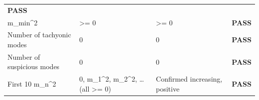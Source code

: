 \documentclass[
  11pt,
]{article}
\begin{document}
\begin{longtable}[]{@{}llll@{}}
\begin{minipage}[t]{0.22\columnwidth}
\textbf{PASS}\strut
\end{minipage}\tabularnewline
\begin{minipage}[t]{0.22\columnwidth}\raggedright
m\_min\^{}2\strut
\end{minipage} & \begin{minipage}[t]{0.22\columnwidth}\raggedright
\textgreater= 0\strut
\end{minipage} & \begin{minipage}[t]{0.22\columnwidth}\raggedright
\textgreater= 0\strut
\end{minipage} & \begin{minipage}[t]{0.22\columnwidth}\raggedright
\textbf{PASS}\strut
\end{minipage}\tabularnewline
\begin{minipage}[t]{0.22\columnwidth}\raggedright
Number of tachyonic modes\strut
\end{minipage} & \begin{minipage}[t]{0.22\columnwidth}\raggedright
0\strut
\end{minipage} & \begin{minipage}[t]{0.22\columnwidth}\raggedright
0\strut
\end{minipage} & \begin{minipage}[t]{0.22\columnwidth}\raggedright
\textbf{PASS}\strut
\end{minipage}\tabularnewline
\begin{minipage}[t]{0.22\columnwidth}\raggedright
Number of suspicious modes\strut
\end{minipage} & \begin{minipage}[t]{0.22\columnwidth}\raggedright
0\strut
\end{minipage} & \begin{minipage}[t]{0.22\columnwidth}\raggedright
0\strut
\end{minipage} & \begin{minipage}[t]{0.22\columnwidth}\raggedright
\textbf{PASS}\strut
\end{minipage}\tabularnewline
\begin{minipage}[t]{0.22\columnwidth}\raggedright
First 10 m\_n\^{}2\strut
\end{minipage} & \begin{minipage}[t]{0.22\columnwidth}\raggedright
0, m\_1\^{}2, m\_2\^{}2, \ldots{} (all \textgreater= 0)\strut
\end{minipage} & \begin{minipage}[t]{0.22\columnwidth}\raggedright
Confirmed increasing, positive\strut
\end{minipage} & \begin{minipage}[t]{0.22\columnwidth}\raggedright
\textbf{PASS}\strut
\end{minipage}\tabularnewline
\bottomrule
\end{longtable}
\end{document}
